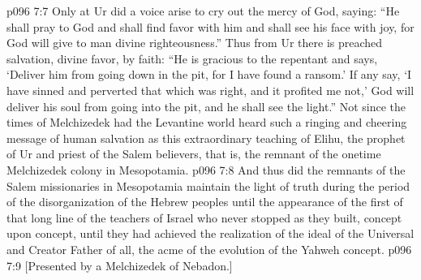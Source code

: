 \vs p096 7:7 Only at Ur did a voice arise to cry out the mercy of God, saying: “He shall pray to God and shall find favor with him and shall see his face with joy, for God will give to man divine righteousness.” Thus from Ur there is preached salvation, divine favor, by faith: “He is gracious to the repentant and says, ‘Deliver him from going down in the pit, for I have found a ransom.’ If any say, ‘I have sinned and perverted that which was right, and it profited me not,’ God will deliver his soul from going into the pit, and he shall see the light.” Not since the times of Melchizedek had the Levantine world heard such a ringing and cheering message of human salvation as this extraordinary teaching of Elihu, the prophet of Ur and priest of the Salem believers, that is, the remnant of the onetime Melchizedek colony in Mesopotamia.
\vs p096 7:8 And thus did the remnants of the Salem missionaries in Mesopotamia maintain the light of truth during the period of the disorganization of the Hebrew peoples until the appearance of the first of that long line of the teachers of Israel who never stopped as they built, concept upon concept, until they had achieved the realization of the ideal of the Universal and Creator Father of all, the acme of the evolution of the Yahweh concept.
\vsetoff
\vs p096 7:9 [Presented by a Melchizedek of Nebadon.]

